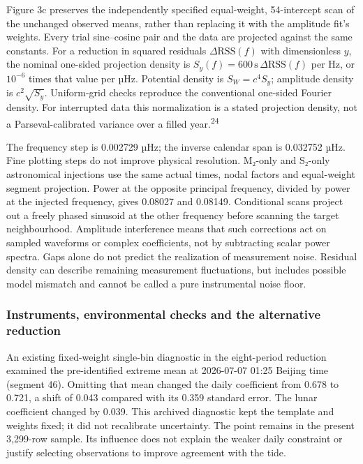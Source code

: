 \documentclass[
  10pt,
  a4paper,
]{article}
\begin{document}
Figure 3c preserves the independently specified equal-weight,
54-intercept scan of the unchanged observed means, rather than replacing
it with the amplitude fit's weights. Every trial sine--cosine pair and
the data are projected against the same constants. For a reduction in
squared residuals \(\Delta\mathrm{RSS}(f)\) with dimensionless \(y\),
the nominal one-sided projection density is
\(S_y(f)=600\,\mathrm{s}\,\Delta\mathrm{RSS}(f)\) per Hz, or \(10^{-6}\)
times that value per µHz. Potential density is \(S_W=c^4S_y\); amplitude
density is \(c^2\sqrt{S_y}\). Uniform-grid checks reproduce the
conventional one-sided Fourier density. For interrupted data this
normalization is a stated projection density, not a Parseval-calibrated
variance over a filled year.\textsuperscript{24}

The frequency step is 0.002729 µHz; the inverse calendar span is
0.032752 µHz. Fine plotting steps do not improve physical resolution.
M₂-only and S₂-only astronomical injections use the same actual times,
nodal factors and equal-weight segment projection. Power at the opposite
principal frequency, divided by power at the injected frequency, gives
0.08027 and 0.08149. Conditional scans project out a freely phased
sinusoid at the other frequency before scanning the target
neighbourhood. Amplitude interference means that such corrections act on
sampled waveforms or complex coefficients, not by subtracting scalar
power spectra. Gaps alone do not predict the realization of measurement
noise. Residual density can describe remaining measurement fluctuations,
but includes possible model mismatch and cannot be called a pure
instrumental noise floor.

\hypertarget{instruments-environmental-checks-and-the-alternative-reduction}{%
\subsubsection{Instruments, environmental checks and the alternative
reduction}\label{instruments-environmental-checks-and-the-alternative-reduction}}

An existing fixed-weight single-bin diagnostic in the eight-period
reduction examined the pre-identified extreme mean at 2026-07-07 01:25
Beijing time (segment 46). Omitting that mean changed the daily
coefficient from 0.678 to 0.721, a shift of 0.043 compared with its
0.359 standard error. The lunar coefficient changed by 0.039. This
archived diagnostic kept the template and weights fixed; it did not
recalibrate uncertainty. The point remains in the present 3,299-row
sample. Its influence does not explain the weaker daily constraint or
justify selecting observations to improve agreement with the tide.
\end{document}
